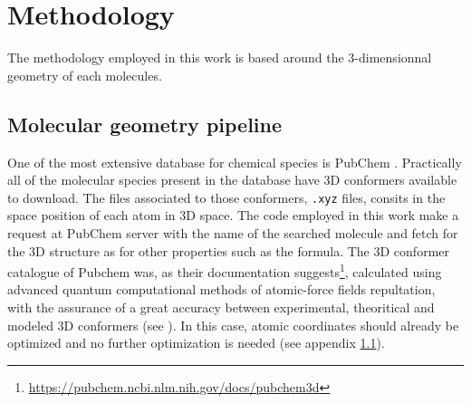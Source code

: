 \documentclass[twocolumn, a4paper, twoside,10pt]{scrartcl}
\begin{document}
\section{Methodology}

The methodology employed in this work is based around the 3-dimensionnal geometry of each molecules.

\subsection{Molecular geometry pipeline}
One of the most extensive database for chemical species is PubChem \citep{kimPubChem2025Update2025}. Practically all of the molecular species present in the database have 3D conformers available to download. The files associated to those conformers, \verb|.xyz| files, consits in the space position of each atom in 3D space. The code employed in this work make a request at PubChem server with the name of the searched molecule and fetch for the 3D structure as for other properties such as the formula. The 3D conformer catalogue of Pubchem was, as their documentation suggests\footnote{\url{https://pubchem.ncbi.nlm.nih.gov/docs/pubchem3d}}, calculated using advanced quantum computational methods of atomic-force fields repultation, with the assurance of a great accuracy between experimental, theoritical and modeled 3D conformers (see \cite{boltonPubChem3DConformerGeneration2011}). In this case, atomic coordinates should already be optimized and no further optimization is needed (see appendix \ref{}).
\end{document}
